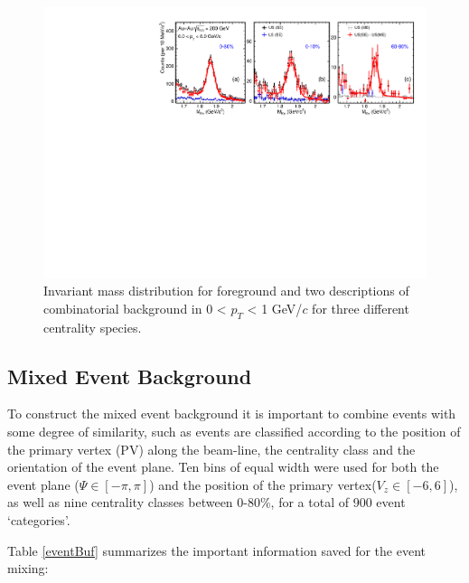 \begin{figure}[htbp]
\centering
\includegraphics[keepaspectratio,width=1.0\textwidth]{figure/Run14_D0HFT/signal_6_8GeV.pdf}
\caption{Invariant mass distribution for foreground and two descriptions of combinatorial background in 0 < $p_T$ < 1 GeV/$c$ for three different centrality species.}
\label{fig:mixedEvent_pt6_8}
\end{figure}

\subsection{Mixed Event Background}

To construct the mixed event background it is important to combine events with some degree of similarity, such as events are classified according to the position of the primary vertex (PV) along the beam-line, the centrality class and the orientation of the event plane. Ten bins of equal width were used for both the event plane ($\Psi\in[-\pi,\pi]$) and the position of the primary vertex($V_z\in[-6,6]$), as well as nine centrality classes between 0-80\%, for a total of 900 event `categories'.

Table \ref{eventBuf} summarizes the important information saved for the event mixing:

